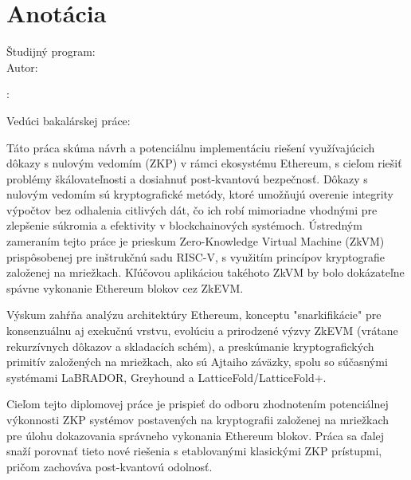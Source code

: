 \thispagestyle{empty}

\vspace*{\fill}

\section*{Anotácia}

\begin{minipage}[t]{1\columnwidth}
    \FIITuniversitySK

    \FIITfacultySK

    Študijný program: \FIITstudyProgramSK\\

    Autor: \FIITauthor

    \FIITthesisSK: \FIITtitleSK

    Vedúci bakalárskej práce: \FIITsupervisor

    \FIITdateSK
\end{minipage}

\bigskip{}

Táto práca skúma návrh a potenciálnu implementáciu riešení využívajúcich
dôkazy s nulovým vedomím (ZKP) v rámci ekosystému Ethereum, s cieľom riešiť
problémy škálovateľnosti a dosiahnuť post-kvantovú bezpečnosť. Dôkazy s
nulovým vedomím sú kryptografické metódy, ktoré umožňujú overenie integrity
výpočtov bez odhalenia citlivých dát, čo ich robí mimoriadne vhodnými pre
zlepšenie súkromia a efektivity v blockchainových systémoch. Ústredným
zameraním tejto práce je prieskum Zero-Knowledge Virtual Machine (ZkVM)
prispôsobenej pre inštrukčnú sadu RISC-V, s využitím princípov kryptografie
založenej na mriežkach. Kľúčovou aplikáciou takéhoto ZkVM by bolo dokázateľne
spávne vykonanie Ethereum blokov cez ZkEVM.

Výskum zahŕňa analýzu architektúry Ethereum, konceptu "snarkifikácie" pre
konsenzuálnu aj exekučnú vrstvu, evolúciu a prirodzené výzvy ZkEVM (vrátane
rekurzívnych dôkazov a skladacích schém), a preskúmanie kryptografických
primitív založených na mriežkach, ako sú Ajtaiho záväzky, spolu so súčasnými
systémami LaBRADOR, Greyhound a LatticeFold/LatticeFold+.

Cieľom tejto diplomovej práce je prispieť do odboru zhodnotením potenciálnej
výkonnosti ZKP systémov postavených na kryptografii založenej na mriežkach pre
úlohu dokazovania správneho vykonania Ethereum blokov. Práca sa ďalej snaží
porovnať tieto nové riešenia s etablovanými klasickými ZKP prístupmi, pričom
zachováva post-kvantovú odolnosť.


